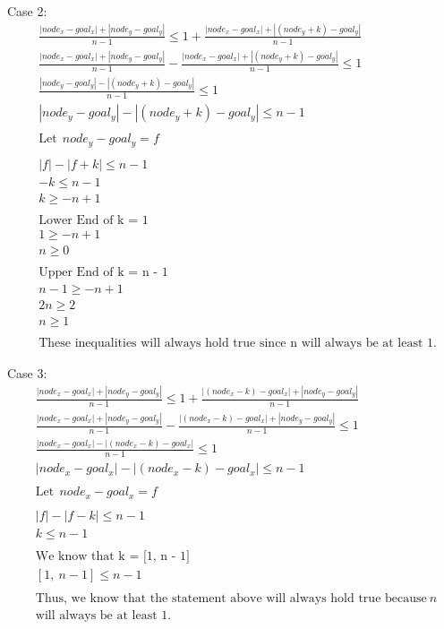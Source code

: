 \documentclass[a4paper]{article}
\begin{document}
\begin{sloppypar}
\begin{enumerate}[start=6,label=Q\arabic*,left=0pt]
    Case 2:
    \begin{align*}
        &\frac{|node_x - goal_x| + |node_y - goal_y|}{n - 1} \leq 1 + \frac{|node_x - goal_x| + |(node_y + k) - goal_y|}{n - 1} \\
        &\frac{|node_x - goal_x| + |node_y - goal_y|}{n - 1} - \frac{|node_x - goal_x| + |(node_y + k) - goal_y|}{n - 1} \leq 1 \\
        &\frac{|node_y - goal_y| - |(node_y + k) - goal_y|}{n - 1} \leq 1 \\
        &|node_y - goal_y| - |(node_y + k) - goal_y| \leq n - 1 \\\\
        &\text{Let} \:\: node_y - goal_y = f \\\\
        &|f| - |f + k| \leq n - 1 \\
        &-k \leq n - 1 \\
        &k \geq -n + 1 \\\\
        &\text{Lower End of k = 1} \\
        &1 \geq -n + 1 \\
        &n \geq 0 \\\\
        &\text{Upper End of k = n - 1} \\
        &n - 1 \geq -n + 1 \\
        &2n \geq 2 \\
        &n \geq 1 \\\\
        &\text{These inequalities will always hold true since n will always be at least 1.}
    \end{align*}

    Case 3:
    \begin{align*}
        &\frac{|node_x - goal_x| + |node_y - goal_y|}{n - 1} \leq 1 + \frac{|(node_x - k) - goal_x| + |node_y - goal_y|}{n - 1} \\
        &\frac{|node_x - goal_x| + |node_y - goal_y|}{n - 1} - \frac{|(node_x - k) - goal_x| + |node_y - goal_y|}{n - 1} \leq 1 \\
        &\frac{|node_x - goal_x| - |(node_x - k) - goal_x|}{n - 1} \leq 1 \\
        &|node_x - goal_x| - |(node_x - k) - goal_x| \leq n - 1 \\\\
        &\text{Let} \:\: node_x - goal_x = f \\\\
        &|f| - |f - k| \leq n - 1 \\
        &k \leq n - 1 \\\\
        &\text{We know that k = [1, n - 1]} \\
        &[1, \: n - 1] \leq n - 1 \\\\
        &\text{Thus, we know that the statement above will always hold true because} \: n \: \\
        &\text{will always be at least 1.}
    \end{align*} 


\end{enumerate}
\end{sloppypar}
\end{document}

